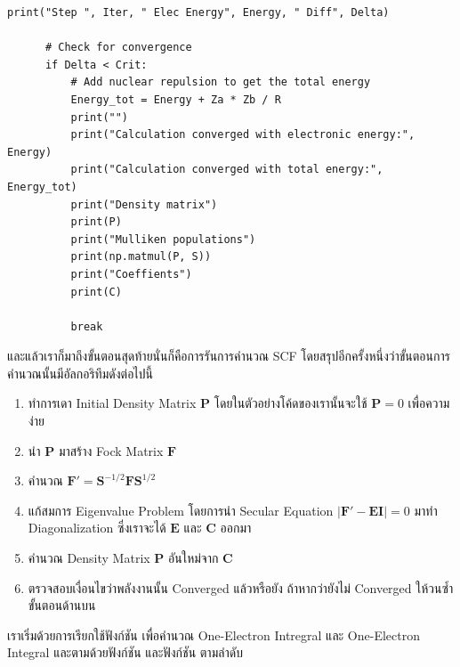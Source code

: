 \begin{lstlisting}[style=MyPython]
      print("Step ", Iter, " Elec Energy", Energy, " Diff", Delta)

      # Check for convergence
      if Delta < Crit:
          # Add nuclear repulsion to get the total energy
          Energy_tot = Energy + Za * Zb / R
          print("")
          print("Calculation converged with electronic energy:", Energy)
          print("Calculation converged with total energy:", Energy_tot)
          print("Density matrix")
          print(P)
          print("Mulliken populations")
          print(np.matmul(P, S))
          print("Coeffients")
          print(C)

          break
\end{lstlisting}

\vspace{5pt}

\noindent {}

\vspace{5pt}

และแล้วเราก็มาถึงขั้นตอนสุดท้ายนั่นก็คือการรันการคำนวณ SCF โดยสรุปอีกครั้งหนึ่งว่าขั้นตอนการคำนวณนั้นมีอัลกอริทึมดังต่อไปนี้
%
\begin{enumerate}[topsep=0pt,noitemsep]
  \setlength\itemsep{0.5em}
  \item ทำการเดา Initial Density Matrix $\bm{P}$ โดยในตัวอย่างโค้ดของเรานั้นจะใช้ $\bm{P} = 0$ เพื่อความง่าย

  \item นำ $\bm{P}$ มาสร้าง Fock Matrix $\bm{F}$

  \item คำนวณ $\bm{F'} = \bm{S}^{-1/2}\bm{F}\bm{S}^{1/2}$

  \item แก้สมการ Eigenvalue Problem โดยการนำ Secular Equation $|\bm{F'} - \bm{E}\bm{I}| = 0$ มาทำ Diagonalization ซึ่งเราจะได้ $\bm{E}$ และ $\bm{C}$ ออกมา

  \item คำนวณ Density Matrix $\bm{P}$ อันใหม่จาก $\bm{C}$

  \item ตรวจสอบเงื่อนไขว่าพลังงานนั้น Converged แล้วหรือยัง ถ้าหากว่ายังไม่ Converged ให้วนซ้ำขั้นตอนด้านบน
\end{enumerate}

เราเริ่มด้วยการเรียกใช้ฟังก์ชัน  เพื่อคำนวณ One-Electron Intregral และ One-Electron Integral และตามด้วยฟังก์ชัน  และฟังก์ชัน  ตามลำดับ

\vspace{5pt}

